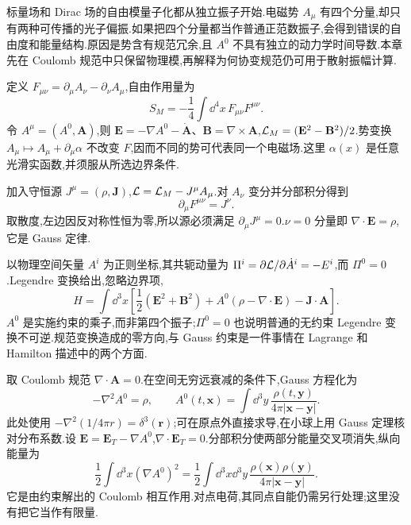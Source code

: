 \label{ch:qed}

标量场和 Dirac 场的自由模量子化都从独立振子开始.电磁势 $A_\mu$ 有四个分量,却只有两种可传播的光子偏振.如果把四个分量都当作普通正范数振子,会得到错误的自由度和能量结构.原因是势含有规范冗余,且 $A^0$ 不具有独立的动力学时间导数.本章先在 Coulomb 规范中只保留物理模,再解释为何协变规范仍可用于散射振幅计算.


定义 $F_{\mu\nu}=\partial_\mu A_\nu-\partial_\nu A_\mu$,自由作用量为
\begin{equation}
 S_M=-\frac14\int\dd^4x\,F_{\mu\nu}F^{\mu\nu}.
\end{equation}
令 $A^\mu=(A^0,\mathbf A)$,则 $\mathbf E=-\nabla A^0-\dot{\mathbf A}$、$\mathbf B=\nabla\times\mathbf A$,$\mathcal L_M=(\mathbf E^2-\mathbf B^2)/2$.势变换 $A_\mu\mapsto A_\mu+\partial_\mu\alpha$ 不改变 $F$,因而不同的势可代表同一个电磁场.这里 $\alpha(x)$ 是任意光滑实函数,并须服从所选边界条件.

加入守恒源 $J^\mu=(\rho,\mathbf J)$,$\mathcal L=\mathcal L_M-J^\mu A_\mu$.对 $A_\nu$ 变分并分部积分得到
\begin{equation}
 \partial_\mu F^{\mu\nu}=J^\nu.
 \label{eq:maxwell-source}
\end{equation}
取散度,左边因反对称性恒为零,所以源必须满足 $\partial_\mu J^\mu=0$.$\nu=0$ 分量即 $\nabla\cdot\mathbf E=\rho$,它是 Gauss 定律.

以物理空间矢量 $A^i$ 为正则坐标,其共轭动量为 $\Pi^i=\partial\mathcal L/\partial\dot A^i=-E^i$,而 $\Pi^0=0$.Legendre 变换给出,忽略边界项,
\begin{equation}
 H=\int\dd^3x\left[\frac12(\mathbf E^2+\mathbf B^2)
  +A^0(\rho-\nabla\cdot\mathbf E)-\mathbf J\cdot\mathbf A\right].
\end{equation}
$A^0$ 是实施约束的乘子,而非第四个振子;$\Pi^0=0$ 也说明普通的无约束 Legendre 变换不可逆.规范变换造成的零方向,与 Gauss 约束是一件事情在 Lagrange 和 Hamilton 描述中的两个方面.


取 Coulomb 规范 $\nabla\cdot\mathbf A=0$.在空间无穷远衰减的条件下,Gauss 方程化为
\begin{equation}
 -\nabla^2A^0=\rho,
 \qquad
 A^0(t,\mathbf x)=\int\dd^3y\,
 \frac{\rho(t,\mathbf y)}{4\pi|\mathbf x-\mathbf y|}.
 \label{eq:coulomb-potential}
\end{equation}
此处使用 $-\nabla^2(1/4\pi r)=\delta^3(\mathbf r)$;可在原点外直接求导,在小球上用 Gauss 定理核对分布系数.设 $\mathbf E=\mathbf E_T-\nabla A^0$,$\nabla\cdot\mathbf E_T=0$.分部积分使两部分能量交叉项消失,纵向能量为
\begin{equation}
 \frac12\int\dd^3x(\nabla A^0)^2
 =\frac12\int\dd^3x\dd^3y\,
 \frac{\rho(\mathbf x)\rho(\mathbf y)}{4\pi|\mathbf x-\mathbf y|}.
\end{equation}
它是由约束解出的 Coulomb 相互作用.对点电荷,其同点自能仍需另行处理;这里没有把它当作有限量.


